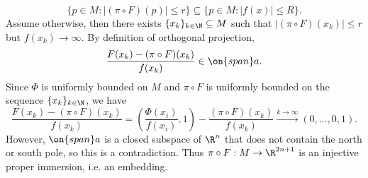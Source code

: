 \documentclass[reqno]{amsart}
\theoremstyle{definition}
\theoremstyle{remark}
\begin{document}
\begin{enumerate}
			\[ \{ p \in M : |(\pi \circ F)(p)| \leq r \} \subseteq \{ p \in M : |f(x)| \leq R \}. \]
		Assume otherwise, then there exists $\{ x_k \}_{k \in \N} \subseteq M$ such that $|(\pi \circ F)(x_k)| \leq r$ but $f(x_k) \to \infty$. By definition of orthogonal projection, 
			\[ \frac{F(x_k) - (\pi \circ F)(x_k)}{f(x_k)} \in \on{span} a. \] 
		Since $\Phi$ is uniformly bounded on $M$ and $\pi \circ F$ is uniformly bounded on the sequence $\{x_k\}_{k \in \N}$, we have
			\[ \frac{F(x_k) - (\pi \circ F)(x_k)}{f(x_k)} = \left( \frac{\Phi(x_i)}{f(x_i)}, 1 \right) - \frac{(\pi \circ F)(x_k)}{f(x_k)} \overset{k \to \infty}{\longrightarrow} (0, \dots, 0, 1). \]
		However, $\on{span} a$ is a closed subspace of $\R^n$ that does not contain the north or south pole, so this is a contradiction. Thus $\pi \circ F : M \to \R^{2n + 1}$ is an injective proper immersion, i.e. an embedding. 
	
\end{enumerate}
\end{document}
